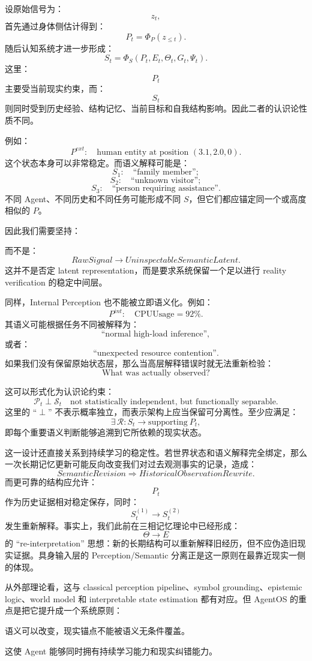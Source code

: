 设原始信号为：
\[
z_t,
\]
首先通过身体侧估计得到：
\[
P_t
=
\Phi_P(z_{\leq t}).
\]
随后认知系统才进一步形成：
\[
S_t
=
\Phi_S(
P_t,
E_t,
\Theta_t,
G_t,
\Psi_t
).
\]
这里：
\[
P_t
\]
主要受当前现实约束，而：
\[
S_t
\]
则同时受到历史经验、结构记忆、当前目标和自我结构影响。因此二者的认识论性质不同。

例如：
\[
P^{ext}:
\quad
\text{human entity at position }(3.1,2.0,0).
\]
这个状态本身可以非常稳定。而语义解释可能是：
\[
S_1:
\quad
\text{``family member''};
\]
\[
S_2:
\quad
\text{``unknown visitor''};
\]
\[
S_3:
\quad
\text{``person requiring assistance''}.
\]
不同 Agent、不同历史和不同任务可能形成不同 $S$，但它们都应锚定同一个或高度相似的 $P$。

因此我们需要坚持：
\begin{statementbox}
\centering
{}
\end{statementbox}
而不是：
\[
RawSignal
\rightarrow
UninspectableSemanticLatent.
\]
这并不是否定 latent representation，而是要求系统保留一个足以进行 reality verification 的稳定中间层。

同样，Internal Perception 也不能被立即语义化。例如：
\[
P^{int}:
\quad
\mathrm{CPUUsage}=92\%.
\]
其语义可能根据任务不同被解释为：
\[
\text{``normal high-load inference''},
\]
或者：
\[
\text{``unexpected resource contention''}.
\]
如果我们没有保留原始状态层，那么当高层解释错误时就无法重新检验：
\[
\text{What was actually observed?}
\]

这可以形式化为认识论约束：
\[
\mathcal P_t
\perp
\mathcal S_t
\quad\text{not statistically independent, but functionally separable}.
\]
这里的 ``$\perp$'' 不表示概率独立，而表示架构上应当保留可分离性。至少应满足：
\[
\exists\,
\mathcal R:
S_t
\rightarrow
\mathrm{supporting}\ P_t,
\]
即每个重要语义判断能够追溯到它所依赖的现实状态。

这一设计还直接关系到持续学习的稳定性。若世界状态和语义解释完全绑定，那么一次长期记忆更新可能反向改变我们对过去观测事实的记录，造成：
\[
SemanticRevision
\Rightarrow
HistoricalObservationRewrite.
\]
而更可靠的结构应允许：
\[
P_t
\]
作为历史证据相对稳定保存，同时：
\[
S_t^{(1)}
\rightarrow
S_t^{(2)}
\]
发生重新解释。事实上，我们此前在三相记忆理论中已经形成：
\[
\Theta\rightarrow E
\]
的 ``re-interpretation'' 思想：新的长期结构可以重新解释旧经历，但不应伪造旧现实证据。具身输入层的 Perception/Semantic 分离正是这一原则在最靠近现实一侧的体现。

从外部理论看，这与 classical perception pipeline、symbol grounding、epistemic logic、world model 和 interpretable state estimation 都有对应。但 AgentOS 的重点是把它提升成一个系统原则：
\begin{proposition*}
语义可以改变，现实锚点不能被语义无条件覆盖。
\end{proposition*}
这使 Agent 能够同时拥有持续学习能力和现实纠错能力。

